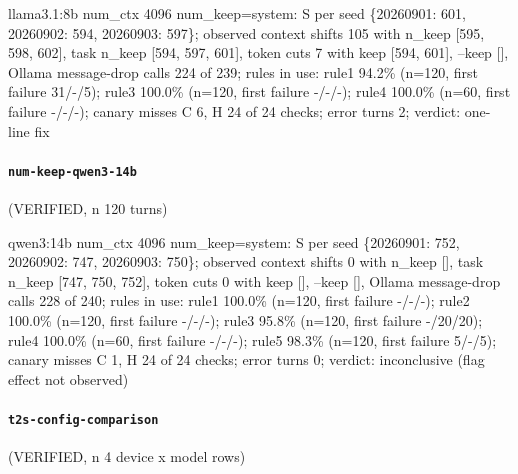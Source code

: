 {\footnotesize\raggedright llama3.1:8b num\_ctx 4096 num\_keep=system: S per seed \{20260901: 601, 20260902: 594, 20260903: 597\}; observed context shifts 105 with n\_keep [595, 598, 602], task n\_keep [594, 597, 601], token cuts 7 with keep [594, 601], --keep [], Ollama message-drop calls 224 of 239; rules in use: rule1 94.2\% (n=120, first failure 31/-/5); rule3 100.0\% (n=120, first failure -/-/-); rule4 100.0\% (n=60, first failure -/-/-); canary misses C 6, H 24 of 24 checks; error turns 2; verdict: one-line fix\par}

\paragraph{\texttt{num-keep-qwen3-14b}} (VERIFIED, n 120 turns)

{\footnotesize\raggedright qwen3:14b num\_ctx 4096 num\_keep=system: S per seed \{20260901: 752, 20260902: 747, 20260903: 750\}; observed context shifts 0 with n\_keep [], task n\_keep [747, 750, 752], token cuts 0 with keep [], --keep [], Ollama message-drop calls 228 of 240; rules in use: rule1 100.0\% (n=120, first failure -/-/-); rule2 100.0\% (n=120, first failure -/-/-); rule3 95.8\% (n=120, first failure -/20/20); rule4 100.0\% (n=60, first failure -/-/-); rule5 98.3\% (n=120, first failure 5/-/5); canary misses C 1, H 24 of 24 checks; error turns 0; verdict: inconclusive (flag effect not observed)\par}

\paragraph{\texttt{t2s-config-comparison}} (VERIFIED, n 4 device x model rows)

